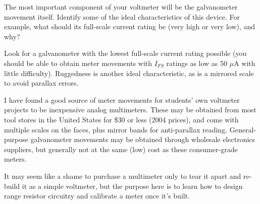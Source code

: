 

The most important component of your voltmeter will be the galvanometer movement itself.  Identify some of the ideal characteristics of this device.  For example, what should its full-scale current rating be (very high or very low), and why?







Look for a galvanometer with the lowest full-scale current rating possible (you should be able to obtain meter movements with $I_{FS}$ ratings as low as 50 $\mu$A with little difficulty).  Ruggedness is another ideal characteristic, as is a mirrored scale to avoid parallax errors.







I have found a good source of meter movements for students' own voltmeter projects to be inexpensive analog multimeters.  These may be obtained from most tool stores in the United States for \$30 or less (2004 prices), and come with multiple scales on the faces, plus mirror bands for anti-parallax reading.  General-purpose galvanometer movements may be obtained through wholesale electronics suppliers, but generally not at the same (low) cost as these consumer-grade meters.

It may seem like a shame to purchase a multimeter only to tear it apart and re-build it as a simple voltmeter, but the purpose here is to learn how to design range resistor circuitry and calibrate a meter once it's built.



